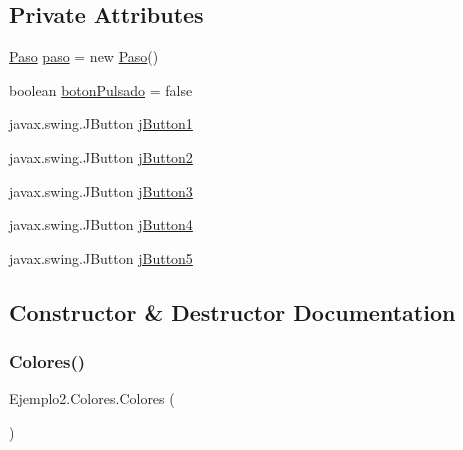 \subsection*{Private Attributes}
\begin{DoxyCompactItemize}
\item 
\mbox{\hyperlink{class_ejemplo2_1_1_paso}{Paso}} \mbox{\hyperlink{class_ejemplo2_1_1_colores_acd6cc98bfb842a0c3977d527e740bf24}{paso}} = new \mbox{\hyperlink{class_ejemplo2_1_1_paso}{Paso}}()
\item 
boolean \mbox{\hyperlink{class_ejemplo2_1_1_colores_a9e166190bfd45aea03b8c118cc6c47fb}{boton\+Pulsado}} = false
\item 
javax.\+swing.\+J\+Button \mbox{\hyperlink{class_ejemplo2_1_1_colores_a42bfb6444d7ec536cc713e227d90e1ba}{j\+Button1}}
\item 
javax.\+swing.\+J\+Button \mbox{\hyperlink{class_ejemplo2_1_1_colores_a43f88dce24ac914a20f0f77be8e5bebb}{j\+Button2}}
\item 
javax.\+swing.\+J\+Button \mbox{\hyperlink{class_ejemplo2_1_1_colores_adbd4afdc65544ac098b878dc8fec5838}{j\+Button3}}
\item 
javax.\+swing.\+J\+Button \mbox{\hyperlink{class_ejemplo2_1_1_colores_a24dad1da5dc4da01bc9d7de20ac614b5}{j\+Button4}}
\item 
javax.\+swing.\+J\+Button \mbox{\hyperlink{class_ejemplo2_1_1_colores_a35c6c2ec6c3ceb50aa3eb4b65558fc0f}{j\+Button5}}
\end{DoxyCompactItemize}


\subsection{Constructor \& Destructor Documentation}
\mbox{\label{class_ejemplo2_1_1_colores_a37a221b0ca2fb16d86981345c9a8f2d4}} 
\subsubsection{\texorpdfstring{Colores()}{Colores()}}
{\footnotesize\ttfamily Ejemplo2.\+Colores.\+Colores (\begin{DoxyParamCaption}{ }\end{DoxyParamCaption})\hspace{0.3cm}{\ttfamily [inline]}}

